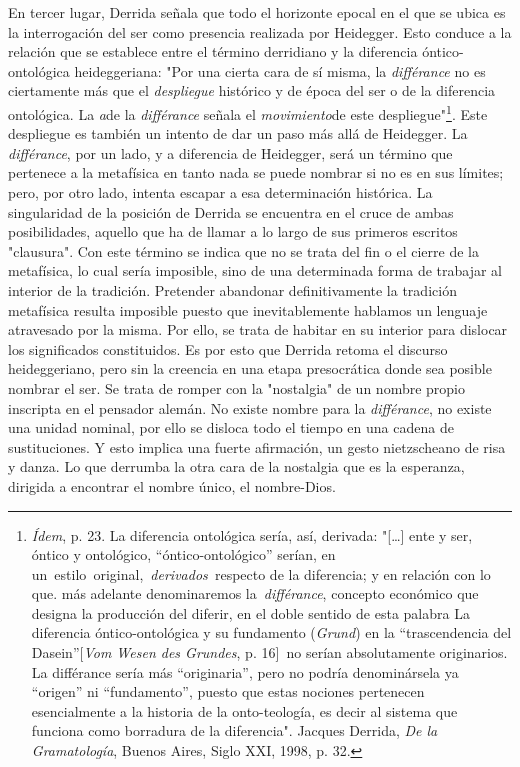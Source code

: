 \documentclass{book}
\begin{document}
En tercer lugar, Derrida señala que todo el horizonte epocal en el que
se ubica es la interrogación del ser como presencia realizada por
Heidegger. Esto conduce a la relación que se establece entre el término
derridiano y la diferencia óntico-ontológica heideggeriana: "Por una
cierta cara de sí misma, la \emph{différance} no es ciertamente más que
el \emph{despliegue} histórico y de época del ser o de la diferencia
ontológica. La \emph{a}de la \emph{différance} señala el
\emph{movimiento}de este despliegue"\footnote{\emph{Ídem}, p. 23. La
  diferencia ontológica sería, así, derivada: "{[}\ldots{]} ente y ser,
  óntico y ontológico, ``óntico-ontológico'' serían, en
  un~estilo\emph{~}original,~\emph{derivados~}respecto de la diferencia;
  y en relación con lo que. más adelante denominaremos
  la~\emph{différance}, concepto económico que designa la producción del
  diferir, en el doble sentido de esta palabra La diferencia
  óntico-ontológica y su fundamento (\emph{Grund}) en la ``trascendencia
  del Dasein''{[}\emph{Vom Wesen des Grundes}, p. 16{]}\emph{~}no serían
  absolutamente originarios. La différance sería más ``originaria'',
  pero no podría denominársela ya ``origen'' ni ``fundamento'', puesto
  que estas nociones pertenecen esencialmente a la historia de la
  onto-teología, es decir al sistema que funciona como borradura de la
  diferencia". Jacques Derrida, \emph{De la Gramatología}, Buenos Aires,
  Siglo XXI, 1998, p. 32.}. Este despliegue es también un intento de dar
un paso más allá de Heidegger. La \emph{différance}, por un lado, y a
diferencia de Heidegger, será un término que pertenece a la metafísica
en tanto nada se puede nombrar si no es en sus límites; pero, por otro
lado, intenta escapar a esa determinación histórica. La singularidad de
la posición de Derrida se encuentra en el cruce de ambas posibilidades,
aquello que ha de llamar a lo largo de sus primeros escritos "clausura".
Con este término se indica que no se trata del fin o el cierre de la
metafísica, lo cual sería imposible, sino de una determinada forma de
trabajar al interior de la tradición. Pretender abandonar
definitivamente la tradición metafísica resulta imposible puesto que
inevitablemente hablamos un lenguaje atravesado por la misma. Por ello,
se trata de habitar en su interior para dislocar los significados
constituidos. Es por esto que Derrida retoma el discurso heideggeriano,
pero sin la creencia en una etapa presocrática donde sea posible nombrar
el ser. Se trata de romper con la "nostalgia" de un nombre propio
inscripta en el pensador alemán. No existe nombre para la
\emph{différance}, no existe una unidad nominal, por ello se disloca
todo el tiempo en una cadena de sustituciones. Y esto implica una fuerte
afirmación, un gesto nietzscheano de risa y danza. Lo que derrumba la
otra cara de la nostalgia que es la esperanza, dirigida a encontrar el
nombre único, el nombre-Dios.
\end{document}
